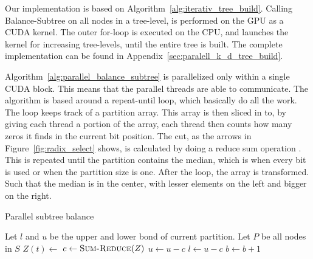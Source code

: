 Our implementation is based on Algorithm~\ref{alg:iterativ_tree_build}. Calling Balance-Subtree on all nodes in a tree-level, is performed on the GPU as a CUDA kernel. The outer for-loop is executed on the CPU, and launches the kernel for increasing tree-levels, until the entire tree is built. The complete implementation can be found in Appendix~\ref{sec:paralell_k_d_tree_build}.

Algorithm~\ref{alg:parallel_balance_subtree} is parallelized only within a single CUDA block. This means that the parallel threads are able to communicate. The algorithm is based around a repeat-until loop, which basically do all the work. The loop keeps track of a partition array. This array is then sliced in to, by giving each thread a portion of the array, each thread then counts how many zeros it finds in the current bit position. The cut, as the arrows in Figure~\ref{fig:radix_select} shows, is calculated by doing a reduce sum operation \citep{parallel_reduction_in_cuda}. This is repeated until the partition contains the median, which is when every bit is used or when the partition size is one. After the loop, the array is transformed. Such that the median is in the center, with lesser elements on the left and bigger on the right.

\begin{algorithm}[ht]
\caption{Parallel subtree balance}
\label{alg:parallel_balance_subtree}
\begin{algorithmic}
        \State Let $l$ and $u$ be the upper and lower bond of current partition.
        \State Let $P$ be all nodes in $S$
        \Repeat
                \State $Z(t) \gets $  
            \EndFor
            \State $c \gets \Call{Sum-Reduce}{Z}$ 
                \State$ u \gets u-c$
            \Else
                \State$l \gets u-c$
            \EndIf
            \State $b \gets b+1$ 
            \State {}
        \State {}
    \EndFunction
\end{algorithmic}
\end{algorithm}

